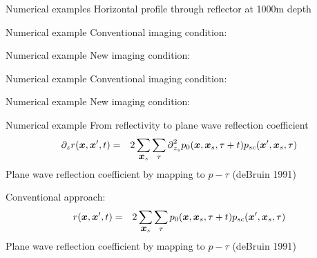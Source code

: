 \documentclass[xcolor=dvipsnames,notes]{beamer}
\begin{document}
\begin{frame}{Numerical examples}
Horizontal profile through reflector at 1000m depth
\begin{figure}
\end{figure}
\end{frame}
\begin{frame}{Numerical example}
Conventional imaging condition:
\begin{figure}
\end{figure}
\end{frame}
\begin{frame}{Numerical example}
New imaging condition:
\begin{figure}
\end{figure}
\end{frame}
\begin{frame}{Numerical example}
Conventional imaging condition:
\begin{figure}
\end{figure}
\end{frame}
\begin{frame}{Numerical example}
New imaging condition:
\begin{figure}
\end{figure}
\end{frame}
\begin{frame}{Numerical example}
From reflectivity to plane wave reflection coefficient
\begin{eqnarray}
  \partial_z r(\mbox{\boldmath $x$},\mbox{\boldmath $x$}',t) & = & 
   2\sum_{\mbox{\boldmath $x$}_s}\sum_{\tau}\mbox{$\partial$}^2_{z_s} p_0(\mbox{\boldmath $x$},\mbox{\boldmath $x$}_s,\tau+t)p_{sc}(\mbox{\boldmath $x$}',\mbox{\boldmath $x$}_s,\tau)
\end{eqnarray}
Plane wave reflection coefficient by mapping to $p-\tau$ (deBruin 1991\cite{Bruin1990}) 

\vspace{1cm}
Conventional approach:
\begin{eqnarray}
  r(\mbox{\boldmath $x$},\mbox{\boldmath $x$}',t) & = & 
   2\sum_{\mbox{\boldmath $x$}_s}\sum_{\tau}p_0(\mbox{\boldmath $x$},\mbox{\boldmath $x$}_s,\tau+t)p_{sc}(\mbox{\boldmath $x$}',\mbox{\boldmath $x$}_s,\tau)
\end{eqnarray}
Plane wave reflection coefficient by mapping to $p-\tau$ (deBruin 1991\cite{Bruin1990}) 

\end{frame}
\end{document}
